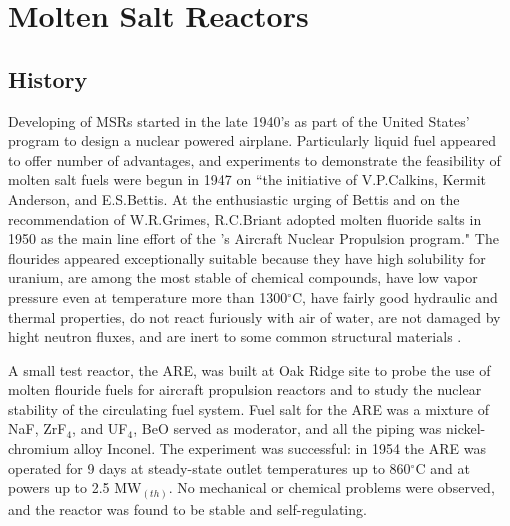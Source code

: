 \chapter[Molten Salt Reactors]{Molten Salt Reactors}


\section{History}

Developing of \glspl{MSR} started in the late 1940's as part of the United States' program to design a nuclear powered airplane. Particularly  liquid fuel appeared to offer number of advantages, and experiments to demonstrate the feasibility of molten salt fuels were begun in 1947 on ``the initiative of V.P.Calkins, Kermit Anderson, and E.S.Bettis. At the enthusiastic urging of Bettis and on the recommendation of W.R.Grimes, R.C.Briant adopted molten fluoride salts in 1950 as the main line effort of the 's Aircraft Nuclear Propulsion program." The flourides appeared exceptionally suitable because they have high solubility for uranium, are among the most stable of chemical compounds, have low vapor pressure even at temperature more than 1300$^{\circ}$C, have fairly good hydraulic and thermal properties, do not react furiously with air of water, are not damaged by hight neutron fluxes, and are inert to some common structural materials \cite{rosenthal_molten-salt_1970}.

A small test reactor, the \gls{ARE}, was built at Oak Ridge site to probe the use of molten flouride fuels for aircraft propulsion reactors and to study the nuclear stability of the circulating fuel system. Fuel salt for the \gls{ARE} was a mixture of NaF, ZrF$_4$, and UF$_4$, BeO served as moderator, and all the piping was nickel-chromium alloy Inconel. The experiment was successful: in 1954 the \gls{ARE} was operated for 9 days at steady-state outlet temperatures up to 860$^{\circ}$C and at powers up to 2.5 MW$_{(th)}$. No mechanical or chemical problems were observed, and the reactor was found to be stable and self-regulating.

